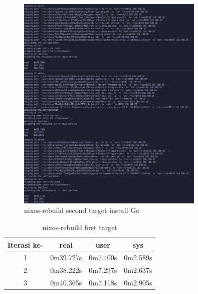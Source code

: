 \documentclass[10pt,]{report}
\begin{document}
\begin{adjustwidth}{20pt}{}
	\begin{figure}[H]
		\begin{center}
			\includegraphics[width=0.8\textwidth]{images/nix-target/nix-go-26-com.png}
		\end{center}
		\caption{nixos-rebuild second target install Go}
	\end{figure}
	\begin{table}[H]
		\caption{nixos-rebuild first target}
		\begin{center}
			\begin{tabular}[c]{|c|c|c|c|}
				\hline
				\multicolumn{1}{|c|}{\textbf{Iterasi ke-}} &
				\multicolumn{1}{c|}{\textbf{real}}         &
				\multicolumn{1}{c|}{\textbf{user}}         &
				\multicolumn{1}{c|}{\textbf{sys}}                                            \\
				\hline
				1                                          & 0m39.727s & 0m7.400s & 0m2.589s \\
				\hline
				2                                          & 0m38.222s & 0m7.297s & 0m2.637s \\
				\hline
				3                                          & 0m40.365s & 0m7.118s & 0m2.905s \\
				\hline
			\end{tabular}
		\end{center}
	\end{table}
	\vspace{-5mm}

\end{adjustwidth}
\end{document}
